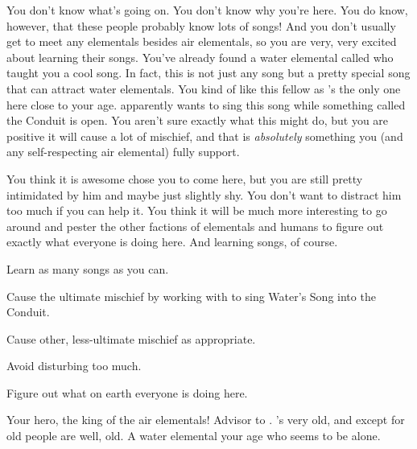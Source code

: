 \documentclass[char]{elementals}
\begin{document}
You don't know what's going on. You don't know why you're here. You do know, however, that these people probably know lots of songs! And you don't usually get to meet any elementals besides air elementals, so you are very, very excited about learning their songs. You've already found a water elemental called \cMiniWater{\intro} who taught you a cool song. In fact, this is not just any song but a pretty special song that can attract water elementals. You kind of like this \cMiniWater{} fellow as \cMiniWater{\they}'s the only one here close to your age. \cMiniWater{\They} apparently wants to sing this song while something called the Conduit is open. You aren't sure exactly what this might do, but you are positive it will cause a lot of mischief, and that is \emph{absolutely} something you (and any self-respecting air elemental) fully support.

You think it is awesome \cKing{} chose you to come here, but you are still pretty intimidated by him and maybe just slightly shy. You don't want to distract him too much if you can help it. You think it will be much more interesting to go around and pester the other factions of elementals and humans to figure out exactly what everyone is doing here. And learning songs, of course.

\begin{itemz}[Goals]
	\item  Learn as many songs as you can.
	\item  Cause the ultimate mischief by working with \cMiniWater{} to sing Water's Song into the Conduit.
	\item  Cause other, less-ultimate mischief as appropriate.
	\item  Avoid disturbing \cKing{} too much.
	\item  Figure out what on earth everyone is doing here.
\end{itemz}

\begin{contacts}
	\contact{\cKing{\intro}} Your hero, the king of the air elementals!
	\contact{\cNaturalist{\intro}} Advisor to \cKing{}. \cNaturalist{\They}'s very old, and except for \cKing{} old people are well, old.
	\contact{\cMiniWater{\intro}} A water elemental your age who seems to be alone.
\end{contacts} 
\end{document}
